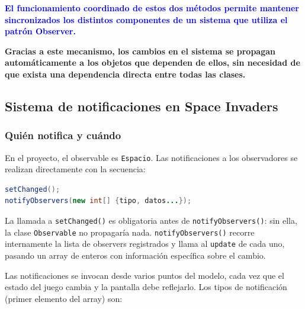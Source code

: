 \documentclass[12pt, a4paper]{article}
\begin{document}
\textcolor{blue}{\textbf{El funcionamiento coordinado de estos dos métodos permite mantener sincronizados los distintos componentes de un sistema que utiliza el patrón Observer.}}

\textbf{Gracias a este mecanismo, los cambios en el sistema se propagan automáticamente a los objetos que dependen de ellos, sin necesidad de que exista una dependencia directa entre todas las clases.}

\subsection{Sistema de notificaciones en Space Invaders}

\subsubsection{Quién notifica y cuándo}

En el proyecto, el observable es \texttt{Espacio}. Las notificaciones a los observadores se realizan directamente con la secuencia:

\begin{lstlisting}[language=Java]
setChanged();
notifyObservers(new int[] {tipo, datos...});
\end{lstlisting}

La llamada a \lstinline|setChanged()| es obligatoria antes de \lstinline|notifyObservers()|: sin ella, la clase \texttt{Observable} no propagaría nada. \texttt{notifyObservers()} recorre internamente la lista de observers registrados y llama al \texttt{update} de cada uno, pasando un array de enteros con información específica sobre el cambio.

Las notificaciones se invocan desde varios puntos del modelo, cada vez que el estado del juego cambia y la pantalla debe reflejarlo. Los tipos de notificación (primer elemento del array) son:
\end{document}
